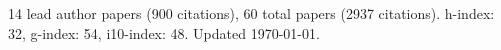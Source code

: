 14 lead author papers (900 citations),
60 total papers (2937 citations).\newline
h-index: 32, g-index: 54, i10-index: 48. Updated \today.